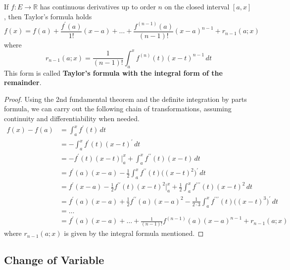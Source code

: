   \begin{theorem}
		\label{thm:integral_form_remainder}
    If $f: E \to \mathbb{R}$ has continuous derivatives up to order $n$ on the closed interval $[a, x]$, then Taylor's formula holds
    \begin{equation}
      f(x) = f(a) + \frac{f^\prime (a)}{1!} (x - a) + \ldots + \frac{f^{(n-1)}(a)}{(n-1)!} (x - a)^{n-1} + r_{n-1}(a; x)
    \end{equation}
    where 
    \begin{equation}
      r_{n-1} (a;x) = \frac{1}{(n-1)!} \int_a^x f^{(n)} (t) (x - t)^{n-1} \,dt
    \end{equation}
    This form is called \textbf{Taylor's formula with the integral form of the remainder}. 
  \end{theorem}
  \begin{proof}
    Using the 2nd fundamental theorem and the definite integration by parts formula, we can carry out the following chain of transformations, assuming continuity and differentiability when needed. 
    \begin{align*}
      f(x) - f(a) & = \int_a^x f^\prime (t) \,dt \\
      & = - \int_a^x f^\prime(t) (x - t)^\prime \,dt \\
      & = -f^\prime (t) (x - t)\big|_a^x + \int_a^x f^{\prime\prime} (t) (x - t) \,dt \\
      & = f^\prime (a) (x - a) - \frac{1}{2} \int_a^x f^{\prime\prime} (t) \big( (x - t)^2\big)^\prime \,dt \\
      & = f^\prime (x - a) - \frac{1}{2} f^{\prime\prime} (t) (x - t)^2 \big|_a^x + \frac{1}{2} \int_a^x f^{\prime\prime\prime} (t) (x - t)^2\,dt \\
      & = f^\prime(a) (x - a) + \frac{1}{2} f^{\prime\prime} (a) (x - a)^2 - \frac{1}{2 \cdot 3} \int_a^x f^{\prime\prime\prime} (t) \big((x - t)^3\big)^\prime\,dt \\
      & = \ldots \\
      & = f^\prime (a) (x - a) + \ldots + \frac{1}{(n-1)!} f^{(n-1)} (a)(x - a)^{n-1} + r_{n-1}(a;x)
    \end{align*}
    where $r_{n-1}(a;x)$ is given by the integral formula mentioned. 
  \end{proof}

\subsection{Change of Variable}

